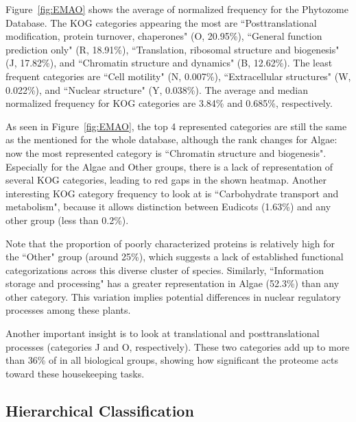 Figure~\ref{fig:EMAO} shows the average of normalized frequency 
for the Phytozome Database. The KOG categories 
appearing the most are ``Posttranslational modification, 
protein turnover, chaperones" (O, 20.95\%), ``General function 
prediction only" (R, 18.91\%), ``Translation, ribosomal 
structure and biogenesis" (J, 17.82\%), and ``Chromatin 
structure and dynamics" (B, 12.62\%). The least frequent 
categories are ``Cell motility" (N, 0.007\%), ``Extracellular 
structures" (W, 0.022\%), and ``Nuclear structure" 
(Y, 0.038\%). The average and median normalized frequency 
for KOG categories are 3.84\% and 0.685\%, respectively. 

As seen in Figure~\ref{fig:EMAO}, the top 4 represented 
categories are still the same as the mentioned for the whole 
database, although the rank changes for Algae: now the most 
represented category is ``Chromatin structure and 
biogenesis". Especially for the Algae and Other groups, there 
is a lack of representation of several KOG categories, 
leading to red gaps in the shown heatmap.
Another interesting KOG category frequency to look at is 
``Carbohydrate transport and metabolism", because it 
allows distinction between Eudicots (1.63\%) and any other 
group (less than 0.2\%).

Note that the proportion of poorly characterized proteins 
is relatively high for the ``Other" group (around 25\%), 
which suggests a lack of established functional 
categorizations across this diverse cluster of species. 
Similarly, ``Information storage and processing" has a 
greater representation in Algae (52.3\%) than any other 
category. This variation implies potential differences 
in nuclear regulatory processes among these plants.

Another important insight is to look at translational 
and posttranslational processes (categories J and O, 
respectively). These two categories add up to more than 
36\% of in all biological groups, showing how significant the 
proteome acts toward these housekeeping tasks.


\subsection{Hierarchical Classification}
\label{sec:results.hierarchy}


